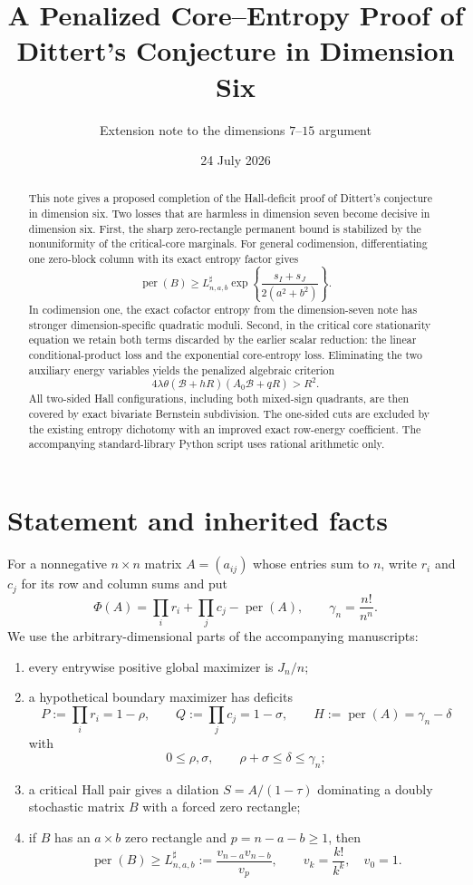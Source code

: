 \documentclass[11pt]{article}
\title{A Penalized Core--Entropy Proof of Dittert's Conjecture in Dimension Six}
\author{Extension note to the dimensions $7$--$15$ argument}
\date{24 July 2026}
\theoremstyle{definition}
\newcommand{\per}{\operatorname{per}}
\begin{document}
\maketitle

\begin{abstract}
This note gives a proposed completion of the Hall-deficit proof of Dittert's
conjecture in dimension six.  Two losses that are harmless in dimension seven
become decisive in dimension six.  First, the sharp zero-rectangle permanent
bound is stabilized by the nonuniformity of the critical-core marginals.  For
general codimension, differentiating one zero-block column with its exact
entropy factor gives
\[
 \per(B)\ge L^{\sharp}_{n,a,b}
 \exp\!\left\{\frac{s_I+s_J}{2(a^2+b^2)}\right\}.
\]
In codimension one, the exact cofactor entropy from the dimension-seven note
has stronger dimension-specific quadratic moduli.  Second, in the critical
core stationarity equation we retain both terms discarded by the earlier
scalar reduction: the linear conditional-product loss and the exponential
core-entropy loss.  Eliminating the two auxiliary energy variables yields the
penalized algebraic criterion
\[
 4\lambda\theta(\mathcal B+hR)(A_0\mathcal B+qR)>R^2.
\]
All two-sided Hall configurations, including both mixed-sign quadrants, are
then covered by exact bivariate Bernstein subdivision.  The one-sided cuts are
excluded by the existing entropy dichotomy with an improved exact row-energy
coefficient.  The accompanying standard-library Python script uses rational
arithmetic only.
\end{abstract}

\section{Statement and inherited facts}

For a nonnegative $n\times n$ matrix $A=(a_{ij})$ whose entries sum to $n$,
write $r_i$ and $c_j$ for its row and column sums and put
\[
 \Phi(A)=\prod_i r_i+\prod_jc_j-\per(A),
 \qquad
 \gamma_n=\frac{n!}{n^n}.
\]
We use the arbitrary-dimensional parts of the accompanying manuscripts:

\begin{enumerate}
\item every entrywise positive global maximizer is $J_n/n$;
\item a hypothetical boundary maximizer has deficits
\[
 P:=\prod_i r_i=1-\rho,
 \qquad Q:=\prod_jc_j=1-\sigma,
 \qquad H:=\per(A)=\gamma_n-\delta
\]
with
\[
 0\le\rho,\sigma,
 \qquad \rho+\sigma\le\delta\le\gamma_n;
 \tag{1.1}\label{eq:budget}
\]
\item a critical Hall pair gives a dilation $S=A/(1-\tau)$ dominating a
doubly stochastic matrix $B$ with a forced zero rectangle;
\item if $B$ has an $a\times b$ zero rectangle and
$p=n-a-b\ge1$, then
\[
 \per(B)\ge L^{\sharp}_{n,a,b}
 :=\frac{v_{n-a}v_{n-b}}{v_p},
 \qquad v_k=\frac{k!}{k^k},\quad v_0=1.
 \tag{1.2}\label{eq:sharp}
\]
\end{enumerate}
\end{document}

